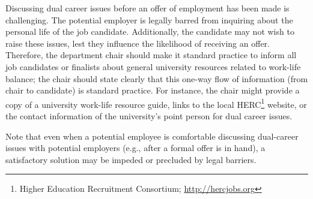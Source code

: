 Discussing dual career issues before an offer of employment has been made is challenging.  The potential employer is legally barred from inquiring about the personal life of the job candidate. Additionally, the candidate may not wish to raise these issues, lest they influence the likelihood of receiving an offer.  Therefore, the department chair should make it standard practice to inform all job candidates or finalists about general university resources related to work-life balance; the chair should state clearly that this one-way flow of information (from chair to candidate) is standard practice.  For instance, the chair might provide a copy of a university work-life resource guide, links to the local HERC\footnote{Higher Education Recruitment Consortium; \href{http://hercjobs.org}{http://hercjobs.org}} website, or the contact information of the university's point person for dual career issues. 

Note that even when a potential employee is comfortable discussing dual-career issues with potential employers (e.g., after a formal offer is in hand), a satisfactory solution may be impeded or precluded by legal barriers.

















